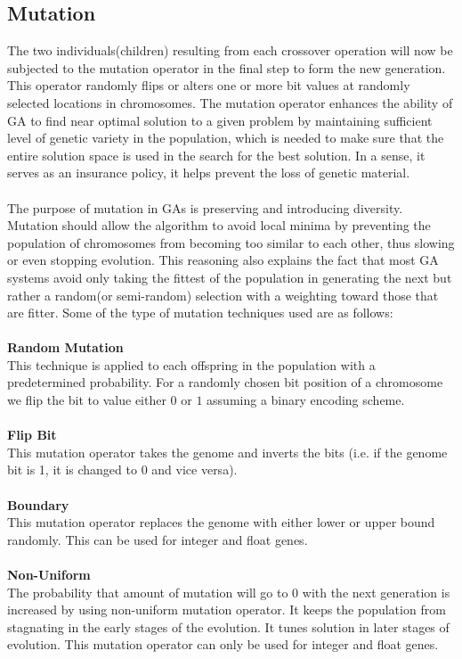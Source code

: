 \documentclass[a4paper, 12pt]{article}
\begin{document}
\subsection{Mutation}
The two individuals(children) resulting from each crossover operation will now be subjected to the mutation operator in the final step to form
the new generation. This operator randomly flips or alters one or more bit values at randomly selected locations in chromosomes. The mutation
operator enhances the ability of GA to find near optimal solution to a given problem by maintaining sufficient level of genetic variety in the 
population, which is needed to make sure that the entire solution space is used in the search for the best solution. In a sense, it serves as 
an insurance policy, it helps prevent the loss of genetic material.\\~\\
The purpose of mutation in GAs is preserving and introducing diversity. Mutation should allow the algorithm to avoid local minima by preventing
the population of chromosomes from becoming too similar to each other, thus slowing or even stopping evolution. This reasoning also explains 
the fact that most GA systems avoid only taking the fittest of the population in generating the next but rather a random(or semi-random) 
selection with a weighting toward those that are fitter. Some of the type of mutation techniques used are as follows:\\~\\
\textbf{Random Mutation}\\
This technique is applied to each offspring in the population with a predetermined probability. For a randomly chosen bit position of a 
chromosome we flip the bit to value either $0$ or $1$ assuming a binary encoding scheme.\\~\\
\textbf{Flip Bit}\\
This mutation operator takes the genome and inverts the bits (i.e. if the genome bit is 1, it is changed to $0$ and vice versa).\\~\\
\textbf{Boundary}\\
This mutation operator replaces the genome with either lower or upper bound randomly. This can be used for integer and float genes.\\~\\
\textbf{Non-Uniform}\\
The probability that amount of mutation will go to 0 with the next generation is increased by using non-uniform mutation operator. It keeps the population from stagnating in the early stages of the evolution. It tunes solution in later stages of evolution. This mutation operator can only be used for integer and float genes.\\~\\
\end{document}
